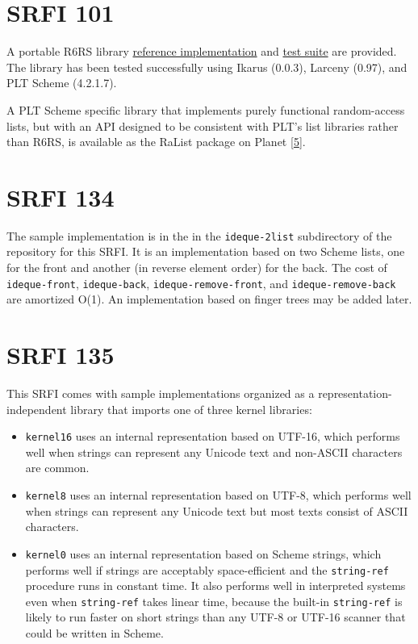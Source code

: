 \section{SRFI 101}

A portable R6RS library \href{srfi-101.sls}{reference implementation}
and \href{srfi-101-tests.sls}{test suite} are provided. The library has
been tested successfully using Ikarus (0.0.3), Larceny (0.97), and PLT
Scheme (4.2.1.7).

A PLT Scheme specific library that implements purely functional
random-access lists, but with an API designed to be consistent with
PLT's list libraries rather than R6RS, is available as the RaList
package on Planet {[}\protect\hyperlink{note-5}{5}{]}.
 
\section{SRFI 134}

The sample implementation is in the in the \texttt{ideque-2list}
subdirectory of the repository for this SRFI. It is an implementation
based on two Scheme lists, one for the front and another (in reverse
element order) for the back. The cost of \texttt{ideque-front},
\texttt{ideque-back}, \texttt{ideque-remove-front}, and
\texttt{ideque-remove-back} are amortized O(1). An implementation based
on finger trees may be added later.

\section{SRFI 135}

This SRFI comes with sample implementations organized as a
representation-independent library that imports one of three kernel
libraries:

\begin{itemize}
\tightlist
\item
  \texttt{kernel16} uses an internal representation based on UTF-16,
  which performs well when strings can represent any Unicode text and
  non-ASCII characters are common.
\item
  \texttt{kernel8} uses an internal representation based on UTF-8, which
  performs well when strings can represent any Unicode text but most
  texts consist of ASCII characters.
\item
  \texttt{kernel0} uses an internal representation based on Scheme
  strings, which performs well if strings are acceptably space-efficient
  and the \texttt{string-ref} procedure runs in constant time. It also
  performs well in interpreted systems even when \texttt{string-ref}
  takes linear time, because the built-in \texttt{string-ref} is likely
  to run faster on short strings than any UTF-8 or UTF-16 scanner that
  could be written in Scheme.
\end{itemize}

